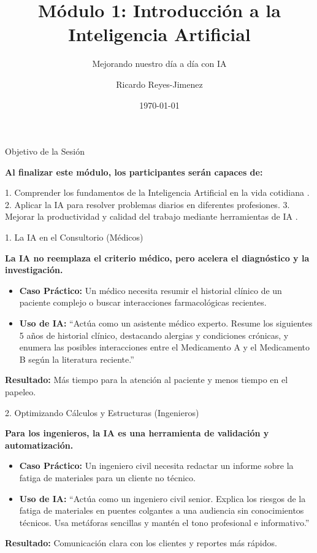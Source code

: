 \documentclass[aspectratio=169]{beamer}
\title[Módulo 1: Introducción a la In]{Módulo 1: Introducción a la Inteligencia Artificial}
\subtitle{Mejorando nuestro día a día con IA}
\author{Ricardo Reyes-Jimenez}
\institute{IA para Todos}
\date{\today}
\begin{document}
\begin{frame}
  \titlepage
\end{frame}

\usebackgroundtemplate{}



\begin{frame}[fragile]{Objetivo de la Sesión}


\textbf{Al finalizar este módulo, los participantes serán capaces de:}

1. Comprender los fundamentos de la Inteligencia Artificial en la vida cotidiana \cite{openai2023}.
2. Aplicar la IA para resolver problemas diarios en diferentes profesiones.
3. Mejorar la productividad y calidad del trabajo mediante herramientas de IA \cite{mckinsey2023}.

\end{frame}



\begin{frame}[fragile]{1. La IA en el Consultorio (Médicos)}


\textbf{La IA no reemplaza el criterio médico, pero acelera el diagnóstico y la investigación.}

\begin{itemize}
  \item \textbf{Caso Práctico:} Un médico necesita resumir el historial clínico de un paciente complejo o buscar interacciones farmacológicas recientes.
  \item \textbf{Uso de IA:} ``Actúa como un asistente médico experto. Resume los siguientes 5 años de historial clínico, destacando alergias y condiciones crónicas, y enumera las posibles interacciones entre el Medicamento A y el Medicamento B según la literatura reciente.''
\end{itemize}
\textbf{Resultado:} Más tiempo para la atención al paciente y menos tiempo en el papeleo.

\end{frame}



\begin{frame}[fragile]{2. Optimizando Cálculos y Estructuras (Ingenieros)}


\textbf{Para los ingenieros, la IA es una herramienta de validación y automatización.}

\begin{itemize}
  \item \textbf{Caso Práctico:} Un ingeniero civil necesita redactar un informe sobre la fatiga de materiales para un cliente no técnico.
  \item \textbf{Uso de IA:} ``Actúa como un ingeniero civil senior. Explica los riesgos de la fatiga de materiales en puentes colgantes a una audiencia sin conocimientos técnicos. Usa metáforas sencillas y mantén el tono profesional e informativo.''
\end{itemize}
\textbf{Resultado:} Comunicación clara con los clientes y reportes más rápidos.

\end{frame}
\end{document}
